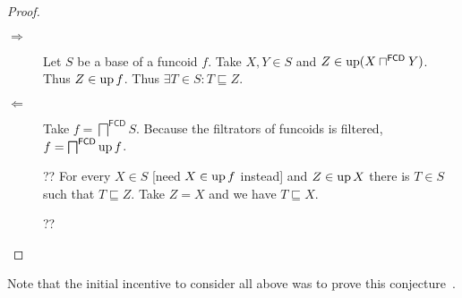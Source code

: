\begin{proof}
  ~
  \begin{description}
    \item[$\Rightarrow$] Let $S$ be a base of a funcoid $f$. Take $X, Y \in S$
    and $Z \in \operatorname{up} (X \sqcap^{\mathsf{FCD}} Y)$. Thus $Z \in
    \operatorname{up} f$. Thus $\exists T \in S : T \sqsubseteq Z$.
    
    \item[$\Leftarrow$] Take $f = \bigsqcap^{\mathsf{FCD}} S$. Because
    the filtrators of funcoids is filtered, $f =
    \bigsqcap^{\mathsf{FCD}} \operatorname{up} f$.
    
    ?? For every $X \in S$ [need $X \in \operatorname{up} f$ instead] and $Z \in
    \operatorname{up} X$ there is $T \in S$ such that $T \sqsubseteq Z$. Take $Z = X$
    and we have $T \sqsubseteq X$.
    
    ??
  \end{description}
\end{proof}


Note that the initial incentive to consider all above was to prove this conjecture~.